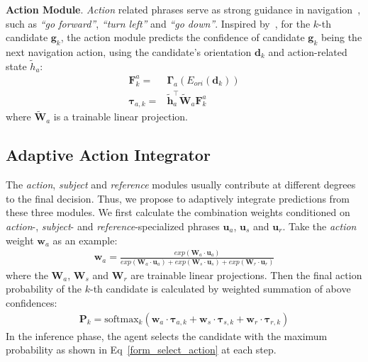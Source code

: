 \documentclass[sigconf]{acmart}
\begin{document}
\vspace{1mm}
\noindent\textbf{Action Module}. \textit{Action} related phrases serve as strong guidance in navigation~\cite{hu2019looking,qi2020oaam}, such as \textit{``go forward''}, \textit{``turn left''} and \textit{``go down''}. Inspired by~\cite{qi2020oaam}, for the $k$-th candidate $\mathbf{g}_k$, the action module predicts the confidence of candidate $\mathbf{g}_k$ being the next navigation action, using the candidate's orientation $\mathbf{d}_k$ and action-related state $\tilde{h}_a$:
\begin{equation}
\begin{aligned}
\mathbf{F}_k^a =& \mathbf{\Gamma}_a(E_{ori}(\mathbf{d}_k))\\ 
	\mathbf{\tau}_{a,k} =&\mathbf{\tilde{h}}_a^\top \mathbf{\widetilde{W}}_a \mathbf{F}_k^a
\end{aligned}
\end{equation}
where $\mathbf{\widetilde{W}}_a$ is a trainable linear projection.

\subsection{Adaptive Action Integrator}\label{sec_integrator}
The \textit{action}, \textit{subject} and \textit{reference} modules usually contribute at different degrees to the final decision.
Thus, we propose to adaptively integrate predictions from these three modules. We first calculate the combination weights conditioned on \textit{action}-, \textit{subject}- and \textit{reference}-specialized phrases $\mathbf{u}_a$, $\mathbf{u}_s$ and $\mathbf{u}_r$. 
Take the \textit{action} weight $\mathbf{w}_a$ as an example:
\begin{align}
	\mathbf{w}_a = \frac{exp(\mathbf{W}_a\cdot \mathbf{u}_a)}{exp(\mathbf{W}_a\cdot \mathbf{u}_a)+exp(\mathbf{W}_s\cdot \mathbf{u}_s)+exp(\mathbf{W}_r\cdot \mathbf{u}_r)}
\end{align} 
where the $\mathbf{W}_a$, $\mathbf{W}_s$ and $\mathbf{W}_r$ are trainable linear projections. Then the final action probability of the $k$-th candidate is calculated by weighted summation of above confidences:
\begin{align}\label{form_fusion_weight}
	\mathbf{P}_k = \textrm{softmax}_k(\mathbf{w}_a\cdot \mathbf{\tau}_{a,k} + \mathbf{w}_s\cdot \mathbf{\tau}_{s,k} + \mathbf{w}_r\cdot \mathbf{\tau}_{r,k})
\end{align}
In the inference phase, the agent selects the candidate with the maximum probability as shown in Eq~\eqref{form_select_action} at each step.
\end{document}

